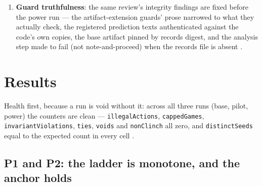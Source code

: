 \documentclass[11pt]{article}
\newcommand{\code}[1]{\texttt{#1}}
\begin{document}
\begin{enumerate}
  everything else unchanged. The 300-seed run becomes the P8 verdict of record; the
  pilot is retained verbatim in the artifact, clearly labelled; both are reported
  whatever they say. The registration notes the direction of the risk honestly:
  raising $N$ after a null could only have refuted the project's own headline
  attribution --- which is the direction honesty points. A correction commit states
  the pilot conclusion's within-design limit; no history is rewritten.
\item \textbf{Guard truthfulness}: the same review's integrity findings are fixed
  before the power run --- the artifact-extension guards' prose narrowed to what they
  actually check, the registered prediction texts authenticated against the code's own
  copies, the base artifact pinned by records digest, and the analysis step made to
  fail (not note-and-proceed) when the records file is absent \cite{repo}.
\end{enumerate}

\section{Results}
\label{sec:results}

Health first, because a run is void without it: across all three runs (base, pilot,
power) the counters are clean --- \code{illegalActions}, \code{cappedGames},
\code{invariantViolations}, \code{ties}, \code{voids} and \code{nonClinch} all zero,
and \code{distinctSeeds} equal to the expected count in every cell \cite{artifact}.

\subsection{P1 and P2: the ladder is monotone, and the anchor holds}
\label{sec:ladder}
\end{document}
